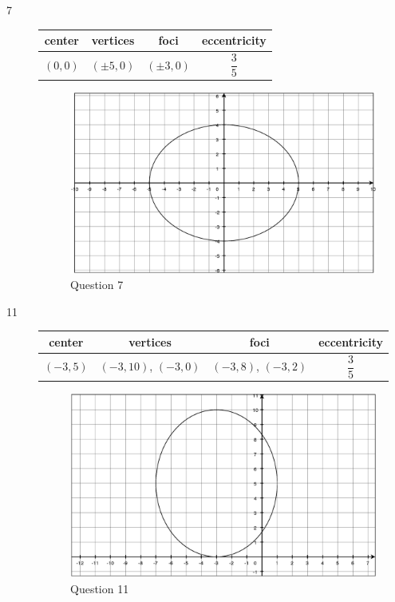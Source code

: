 \documentclass[fleqn,addpoints]{exam}
\begin{document}
\begin{description}
\item[7]

\begin{tabular}{cccc}
\toprule
center & vertices & foci & eccentricity \\
\midrule
  $(0, 0)$ & $(\pm 5, 0)$ & $(\pm 3, 0)$ & $\dfrac{3}{5}$ \\
\bottomrule
\end{tabular}

\begin{figure}[H]
  \centering
  \includegraphics[scale=.3]{p792_7.eps}
  \caption*{Question 7}
\end{figure}

\item[11]

\begin{tabular}{cccc}
\toprule
center & vertices & foci & eccentricity \\
\midrule
  $(-3, 5)$ & $(-3, 10)$, $(-3, 0)$ & $(-3, 8)$, $(-3, 2)$ & $\dfrac{3}{5}$ \\
\bottomrule
\end{tabular}

\begin{figure}[H]
  \centering
  \includegraphics[scale=.3]{p792_11.eps}
  \caption*{Question 11}
\end{figure}


\end{description}
\end{document}
